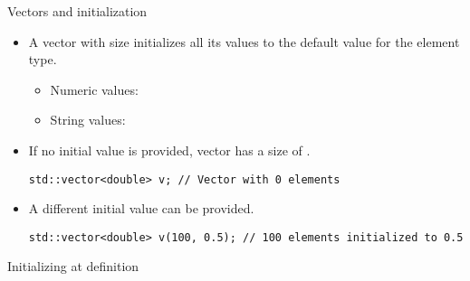 \begin{frame}[t,fragile]{Vectors and initialization}
\begin{itemize}
  \item A vector with size initializes all its values to the default value for the element type.
    \begin{itemize}
      \item Numeric values: 
      \item String values: 
    \end{itemize}

  \vfill
  \item If no initial value is provided, vector has a size of .
\begin{lstlisting}
std::vector<double> v; // Vector with 0 elements
\end{lstlisting}

  \vfill
  \item A different initial value can be provided.
\begin{lstlisting}
std::vector<double> v(100, 0.5); // 100 elements initialized to 0.5
\end{lstlisting}
\end{itemize}
\end{frame}

\begin{frame}
\begin{block}{Initializing at definition}

\end{block}
\end{frame}

